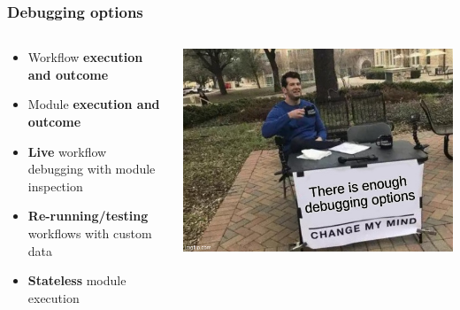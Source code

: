 \begin{frame}
    \frametitle{Debugging options}
    \begin{columns}
        \begin{column}{0.6\textwidth}
            \begin{itemize}
                \item Workflow \textbf{execution and outcome}
                \item Module \textbf{execution and outcome}
                \item \textbf{Live} workflow debugging with module inspection
                \item \textbf{Re-running/testing} workflows with custom data
                \item \textbf{Stateless} module execution
            \end{itemize}
        \end{column}
        \begin{column}{0.4\textwidth}
            \includegraphics[width=1.0\linewidth]{pictures/enough-debugging.jpg}
        \end{column}
    \end{columns}
\end{frame}

